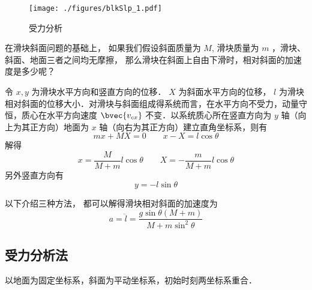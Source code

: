 


\begin{figure}[ht]
\centering
\texttt{[image: ./figures/blkSlp\_1.pdf]}
\caption{受力分析} \label{blkSlp_fig1}
\end{figure}

在滑块斜面问题的基础上， 如果我们假设斜面质量为 $M$, 滑块质量为 $m$ ，滑块、斜面、地面三者之间均无摩擦， 那么滑块在斜面上自由下滑时，相对斜面的加速度是多少呢？

令 $x, y$ 为滑块水平方向和竖直方向的位移． $X$ 为斜面水平方向的位移， $l$ 为滑块相对斜面的位移大小．对滑块与斜面组成得系统而言，在水平方向不受力，动量守恒，质心在水平方向速度 $\bvec{v_{cx}}$ 不变．以系统质心所在竖直方向为 $y$ 轴（向上为其正方向）地面为 $x$ 轴（向右为其正方向）建立直角坐标系，则有
\begin{equation}
mx+MX=0 \qquad x-X=l\cos\theta
\end{equation}
解得
\begin{equation}\label{blkSlp_eq2}
x = \frac{M}{M + m}l\cos\theta \qquad X = -\frac{m}{M + m}l\cos\theta
\end{equation}
另外竖直方向有
\begin{equation}
y = -l\sin\theta
\end{equation}

以下介绍三种方法， 都可以解得滑块相对斜面的加速度为
\begin{equation}\label{blkSlp_eq1}
a = \ddot l = \frac{g\sin\theta(M+m)}{M + m\sin^2\theta}
\end{equation}

\subsection{受力分析法}
以地面为固定坐标系，斜面为平动坐标系，初始时刻两坐标系重合．

